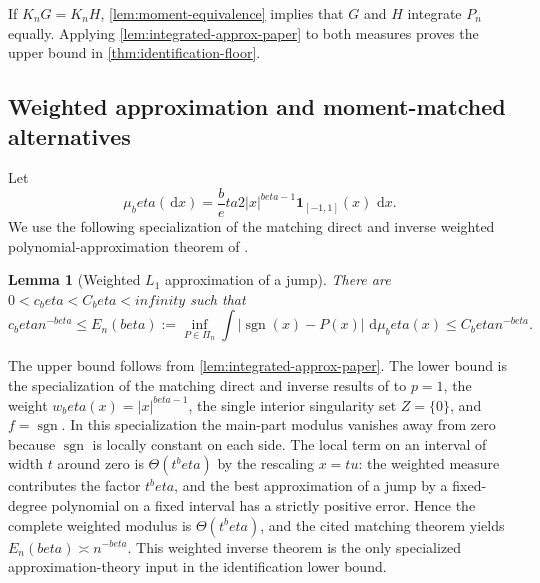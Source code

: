 \documentclass[11pt]{article}
\def\beta{beta}%
\def\infty{infinity}%
\newtheorem{lemma}[theorem]{Lemma}
\newcommand{\one}{\mathbf 1}
\newcommand{\sgn}{\operatorname{sgn}}
\newcommand{\dd}{\,\mathrm d}
\begin{document}
If $K_nG=K_nH$, \cref{lem:moment-equivalence} implies that $G$ and $H$ integrate $P_n$ equally.  Applying \cref{lem:integrated-approx-paper} to both measures proves the upper bound in \cref{thm:identification-floor}.

\subsection{Weighted approximation and moment-matched alternatives}

Let
\[
\mu_\beta(\dd x)
=
\frac\beta2|x|^{\beta-1}\one_{[-1,1]}(x)\,\dd x.
\]
We use the following specialization of the matching direct and inverse weighted polynomial-approximation theorem of \citet{Kopotun}.

\begin{lemma}[Weighted $L_1$ approximation of a jump]
\label{lem:weighted-sign-paper}
There are $0<c_\beta<C_\beta<\infty$ such that
\[
c_\beta n^{-\beta}
\le
E_n(\beta)
:=
\inf_{P\in\Pi_n}
\int|\sgn(x)-P(x)|\,\dd\mu_\beta(x)
\le
C_\beta n^{-\beta}.
\]
\end{lemma}

The upper bound follows from \cref{lem:integrated-approx-paper}.  The lower bound is the specialization of the matching direct and inverse results of \citet[Theorems~5.2 and~9.1]{Kopotun} to $p=1$, the weight $w_\beta(x)=|x|^{\beta-1}$, the single interior singularity set $Z=\{0\}$, and $f=\sgn$.  In this specialization the main-part modulus vanishes away from zero because $\sgn$ is locally constant on each side.  The local term on an interval of width $t$ around zero is $\Theta(t^\beta)$ by the rescaling $x=tu$: the weighted measure contributes the factor $t^\beta$, and the best approximation of a jump by a fixed-degree polynomial on a fixed interval has a strictly positive error.  Hence the complete weighted modulus is $\Theta(t^\beta)$, and the cited matching theorem yields $E_n(\beta)\asymp n^{-\beta}$.  This weighted inverse theorem is the only specialized approximation-theory input in the identification lower bound.
\end{document}
